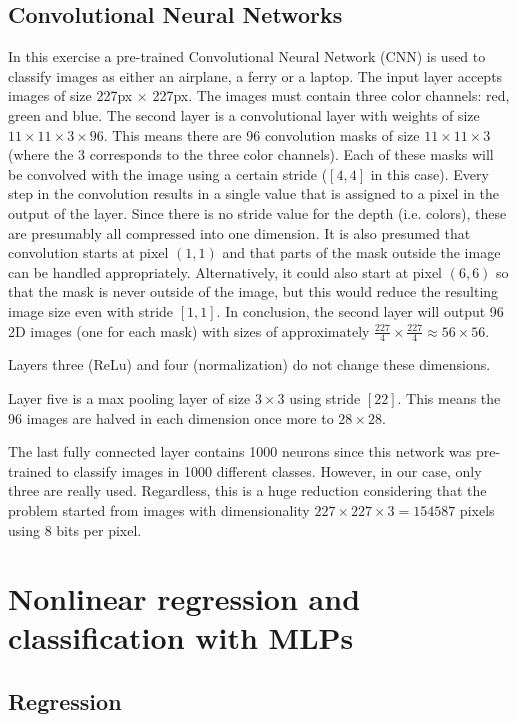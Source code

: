 \documentclass[a4, 10pt, twoside, twocolumn]{article}
\numberwithin{figure}{section}
\begin{document}
\subsection{Convolutional Neural Networks}
In this exercise a pre-trained Convolutional Neural Network (CNN) is used to classify images as either an airplane, a ferry or a laptop. The input layer accepts images of size 227px $\times$ 227px. The images must contain three color channels: red, green and blue. The second layer is a convolutional layer with weights of size $11 \times 11 \times 3 \times 96$. This means there are 96 convolution masks of size $11 \times 11 \times 3$ (where the 3 corresponds to the three color channels). Each of these masks will be convolved with the image using a certain stride ($[4, 4]$ in this case). Every step in the convolution results in a single value that is assigned to a pixel in the output of the layer. Since there is no stride value for the depth (i.e. colors), these are presumably all compressed into one dimension. It is also presumed that convolution starts at pixel $(1, 1)$ and that parts of the mask outside the image can be handled appropriately. Alternatively, it could also start at pixel $(6, 6)$ so that the mask is never outside of the image, but this would reduce the resulting image size even with stride $[1, 1]$. In conclusion, the second layer will output 96 2D images (one for each mask) with sizes of approximately $\frac{227}{4} \times \frac{227}{4} \approx 56 \times 56$. 

Layers three (ReLu) and four (normalization) do not change these dimensions.

Layer five is a max pooling layer of size $3 \times 3$ using stride $[2 2]$. This means the 96 images are halved in each dimension once more to $28 \times 28$.

The last fully connected layer contains 1000 neurons since this network was pre-trained to classify images in 1000 different classes. However, in our case, only three are really used. Regardless, this is a huge reduction considering that the problem started from images with dimensionality $227 \times 227 \times 3 = 154 587$ pixels using 8 bits per pixel. 

\section{Nonlinear regression and classification with MLPs}
\subsection{Regression}
\label{ssec:p1_regression}
\end{document}
